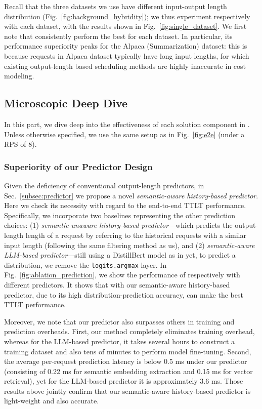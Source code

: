 Recall that the three datasets we use have different input-output length distribution (Fig.~\ref{fig:background_hybridity}); we thus experiment respectively with each dataset, with the results shown in Fig.~\ref{fig:single_dataset}.
We first note that \oursched consistently perform the best for each dataset.
In particular, its performance superiority peaks for the Alpaca (Summarization) dataset: this is because requests in Alpaca dataset typically have long input lengths, for which existing output-length based scheduling methods are highly inaccurate in cost modeling. 



\subsection{Microscopic Deep Dive}

In this part, we dive deep into the effectiveness of each solution component in \oursched.
Unless otherwise specified, we use the same setup as in Fig.~\ref{fig:e2e} (under a RPS of 8).

\subsubsection{Superiority of our Predictor Design}

Given the deficiency of conventional output-length predictors, in Sec.~\ref{subsec:predictor} we propose a novel \emph{semantic-aware history-based predictor}.
Here we check its necessity with regard to the end-to-end TTLT performance.
Specifically, we incorporate two baselines representing the other prediction choices: (1) \emph{semantic-unaware history-based predictor}---which predicts the output-length length of a request by referring to the historical requests with a similar input length (following the same filtering method as us), and (2) \emph{semantic-aware LLM-based predictor}---still using a DistillBert model as in \cite{qiu2024efficient} yet, to predict a distribution, we remove the \texttt{logits.argmax} layer.
In Fig.~\ref{fig:ablation_prediction}, we show the performance of \oursched respectively with different predictors.
It shows that with our semantic-aware history-based predictor, due to its high distribution-prediction accuracy, \oursched can make the best TTLT performance.

Moreover, we note that our predictor also surpasses others in training and prediction overheads.
First, our method completely eliminates training overhead, whereas for the LLM-based predictor, it takes several hours to construct a training dataset and also tens of minutes to perform model fine-tuning.
Second, the average per-request prediction latency is below 0.5 ms under our predictor (consisting of 0.22 ms for semantic embedding extraction and 0.15 ms for vector retrieval), yet for the LLM-based predictor it is approximately 3.6 ms.
Those results above jointly confirm that our semantic-aware history-based predictor is light-weight and also accurate.



